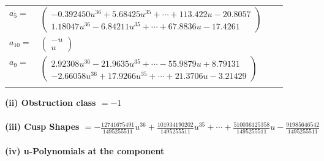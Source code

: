 \documentclass[1p]{elsarticle_modified}
\theoremstyle{definition}
\begin{document}
\begin{tabular}{m{7pt} m{180pt} m{7pt} m{180pt} }
\flushright $a_{5}=$&$\begin{pmatrix}-0.392450 u^{36}+5.68425 u^{35}+\cdots+113.422 u-20.8057\\1.18047 u^{36}-6.84211 u^{35}+\cdots+67.8836 u-17.4261\end{pmatrix}$ \\
\flushright $a_{10}=$&$\begin{pmatrix}- u\\u\end{pmatrix}$ \\
\flushright $a_{9}=$&$\begin{pmatrix}2.92308 u^{36}-21.9635 u^{35}+\cdots-55.9879 u+8.79131\\-2.66058 u^{36}+17.9266 u^{35}+\cdots+21.3706 u-3.21429\end{pmatrix}$\\&\end{tabular}
\flushleft \textbf{(ii) Obstruction class $= -1$}\\~\\
\flushleft \textbf{(iii) Cusp Shapes $= -\frac{12741675491}{1495255511} u^{36}+\frac{101934190202}{1495255511} u^{35}+\cdots+\frac{510036125358}{1495255511} u-\frac{91985646542}{1495255511}$}\\~\\
\newpage\renewcommand{\arraystretch}{1}
\flushleft \textbf{(iv) u-Polynomials at the component}\newline \\
\end{document}
